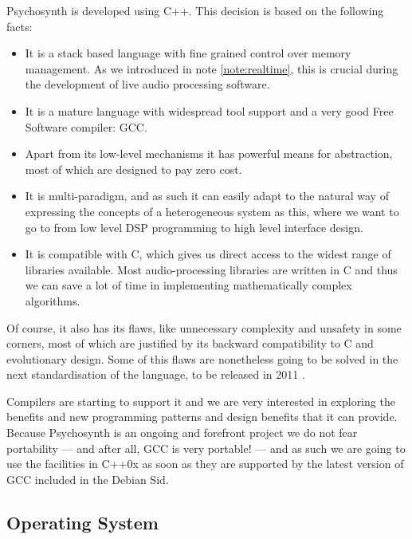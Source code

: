 Psychosynth is developed using C++. This decision is based on the
following facts:

\begin{itemize}
\item It is a stack based language with fine grained control over
  memory management. As we introduced in note \ref{note:realtime},
  this is crucial during the development of live audio processing
  software.

\item It is a mature language with widespread tool support and a very
  good Free Software compiler: GCC.

\item Apart from its low-level mechanisms it has powerful means for
  abstraction, most of which are designed to pay zero cost.

\item It is multi-paradigm, and as such it can easily adapt to the
  natural way of expressing the concepts of a heterogeneous system as
  this, where we want to go to from low level DSP programming to high
  level interface design.

\item It is compatible with C, which gives us direct access to the
  widest range of libraries available. Most audio-processing libraries
  are written in C and thus we can save a lot of time in
  implementing mathematically complex algorithms. 
\end{itemize}

Of course, it also has its flaws, like unnecessary complexity and
unsafety in some corners, most of which are justified by its backward
compatibility to C and evolutionary design. Some of this flaws are
nonetheless going to be solved in the next standardisation of the
language, to be released in 2011 \cite{herb10iso}.


Compilers are starting to support it and we are very interested in
exploring the benefits and new programming patterns and design
benefits that it can provide. Because Psychosynth is an ongoing and
forefront project we do not fear portability --- and after all, GCC is
very portable! --- and as such we are going to use the facilities in
C++0x as soon as they are supported by the latest version of GCC
included in the Debian Sid.

\subsection{Operating System}

